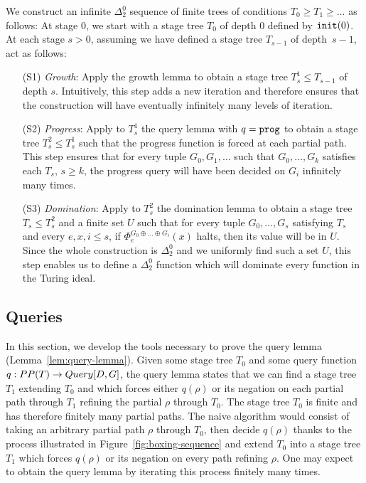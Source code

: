 We construct an infinite $\Delta^0_2$ sequence of finite trees of conditions $T_0 \geq T_1 \geq \dots$ as follows:
At stage 0, we start with a stage tree $T_0$ of depth 0 defined by $\mathtt{init}(0)$.
At each stage $s > 0$, assuming we have defined a stage tree $T_{s-1}$ of depth~$s-1$, act as follows:
\begin{itemize}
	\item[(S1)] \emph{Growth}: Apply the growth lemma to obtain a stage tree $T^1_s \leq T_{s-1}$
	of depth $s$.
	Intuitively, this step adds a new iteration and therefore ensures that the construction will have eventually
	infinitely many levels of iteration.

	\item[(S2)] \emph{Progress}: Apply to $T^1_s$ the query lemma with $q = \mathtt{prog}$ to obtain a stage
	tree $T^2_s \leq T^1_s$ such that the progress function is forced at each partial path.
	This step ensures that for every tuple $G_0, G_1, \dots$ such that $G_0, \dots, G_k$
	satisfies each $T_s$, $s \geq k$, the progress query will have been decided
	on $G_i$ infinitely many times.

	\item[(S3)] \emph{Domination}: Apply to $T^2_s$ the domination lemma to obtain
	a stage tree $T_s \leq T^2_s$ and a finite set $U$ such that for every tuple $G_0, \dots, G_s$
	satisfying $T_s$ and every $e, x, i \leq s$, if $\Phi_e^{G_0 \oplus \dots \oplus G_i}(x)$ halts,
	then its value will be in $U$. Since the whole construction is $\Delta^0_2$
	and we uniformly find such a set $U$, this step enables us to define a $\Delta^0_2$
	function which will dominate every function in the Turing ideal.
\end{itemize}

\subsection{Queries}\label{subsect:queries-detailed}

In this section, we develop the tools necessary to prove the query lemma (Lemma~\ref{lem:query-lemma}).
Given some stage tree $T_0$ and some query function $q : PP(T) \to \mathop{Query}[D, G]$, the query lemma
states that we can find a stage tree $T_1$ extending $T_0$ and which forces either $q(\rho)$
or its negation on each partial path through $T_1$ refining the partial $\rho$ through $T_0$.
The stage tree $T_0$ is finite and has therefore finitely many partial paths.
The naive algorithm would consist of taking an arbitrary partial path $\rho$ through $T_0$,
then decide $q(\rho)$ thanks to the process illustrated in Figure~\ref{fig:boxing-sequence} and extend $T_0$
into a stage tree $T_1$ which forces $q(\rho)$ or its negation on every path refining $\rho$.
One may expect to obtain the query lemma by iterating this process finitely many times.

